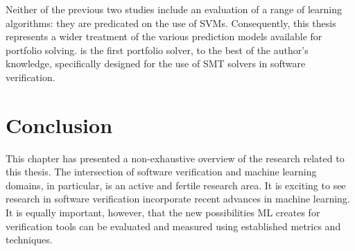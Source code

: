 Neither of the previous two studies include an evaluation of a range of learning algorithms: they are predicated on the use of SVMs. Consequently, this thesis represents a wider treatment of the various prediction models available for portfolio solving. \where is the first portfolio solver, to the best of the author's knowledge, specifically designed for the use of SMT solvers in software verification.

\section{Conclusion}

This chapter has presented a non-exhaustive overview of the research related to this thesis. The intersection of software verification and machine learning domains, in particular, is an active and fertile research area. It is exciting to see research in software verification incorporate recent advances in machine learning. It is equally important, however, that the new possibilities ML creates for verification tools can be evaluated and measured using established metrics and techniques.    
